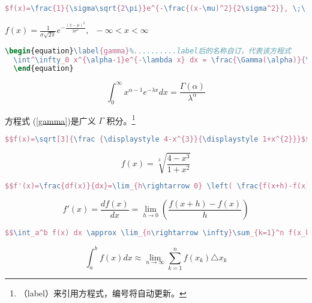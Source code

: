   \begin{lstlisting}[language=TeX,numbers=none,frame=lrtb,keywords={begin},label=Normal,caption=Normal] 
  $f(x)=\frac{1}{\sigma\sqrt{2\pi}}e^{-\frac{(x-\mu)^2}{2\sigma^2}}, \;\;  -\infty < x < \infty $
  \end{lstlisting}
  $f(x)=\frac{1}{\sigma\sqrt{2\pi}}e^{-\frac{(x-\mu)^2}{2\sigma^2}}, \;\;  -\infty < x < \infty $
  
    \begin{lstlisting}[language=TeX,numbers=none,frame=lrtb,keywords={begin},label=Int,caption=\song 积分式与方程式编号] 
  \begin{equation}\label{gamma}%..........label后的名称自订，代表该方程式
  \int^\infty_0 x^{\alpha-1}e^{-\lambda x} dx = \frac{\Gamma(\alpha)}{\lambda^{\alpha}}
  \end{equation}
  \end{lstlisting}
  \begin{equation}\label{gamma}%
  \int^\infty_0 x^{\alpha-1}e^{-\lambda x} dx = \frac{\Gamma(\alpha)}{\lambda^{\alpha}}
  \end{equation}
  
  方程式 (\ref{gamma})是广义 $\Gamma$ 积分。\footnote{（label）来引用方程式，编号将自动更新。}
  
  \begin{lstlisting}[language=TeX,numbers=none,frame=lrtb,keywords={begin},label=Sqrt,caption=\song 开根号] 
  $$f(x)=\sqrt[3]{\frac {\displaystyle 4-x^{3}}{\displaystyle 1+x^{2}}}$$
  \end{lstlisting}
  $$f(x)=\sqrt[3]{\frac {\displaystyle 4-x^{3}}{\displaystyle 1+x^{2}}}$$
  
  \begin{lstlisting}[language=TeX,numbers=none,frame=lrtb,keywords={begin},label=limit,caption=\song 微分与极限（注意大刮号的使用）] 
  $$f'(x)=\frac{df(x)}{dx}=\lim_{h\rightarrow 0} \left( \frac{f(x+h)-f(x)}{h} \right)$$
  \end{lstlisting}  
  $$f'(x)=\frac{df(x)}{dx}=\lim_{h\rightarrow 0}\left(\frac{f(x+h)-f(x)}{h}\right)$$
  
    \begin{lstlisting}[language=TeX,numbers=none,frame=lrtb,keywords={begin},label=upanddown,caption=\song 上下限的使用] 
 $$\int_a^b f(x) dx \approx \lim_{n\rightarrow \infty}\sum_{k=1}^n f(x_k)\triangle x_k$$
  \end{lstlisting} 
  $$\int_a^b f(x) dx \approx \lim_{n\rightarrow \infty}\sum_{k=1}^n f(x_k)\triangle x_k$$
  
